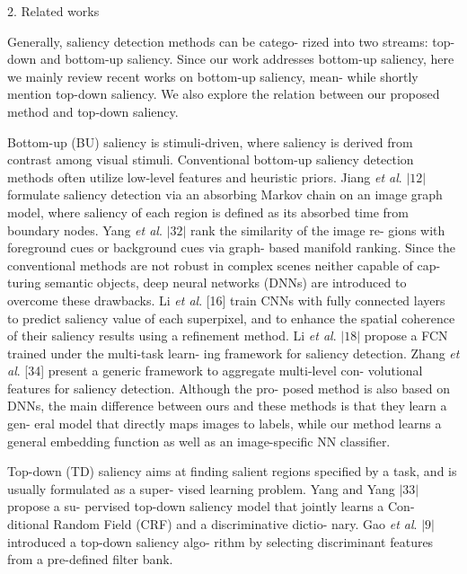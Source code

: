 \documentclass[a4paper,10pt]{article}
\begin{document}
2. Related works

Generally, saliency detection methods can be catego- rized into two streams: top-down and bottom-up saliency. Since our work addresses bottom-up saliency, here we mainly review recent works on bottom-up saliency, mean- while shortly mention top-down saliency. We also explore the relation between our proposed method and top-down saliency.

Bottom-up (BU) saliency is stimuli-driven, where saliency is derived from contrast among visual stimuli. Conventional bottom-up saliency detection methods often utilize low-level features and heuristic priors. Jiang {\it et al}. $|12|$ formulate saliency detection via an absorbing Markov chain on an image graph model, where saliency of each region is defined as its absorbed time from boundary nodes. Yang {\it et al}. $|32|$ rank the similarity of the image re- gions with foreground cues or background cues via graph- based manifold ranking. Since the conventional methods are not robust in complex scenes neither capable of cap- turing semantic objects, deep neural networks (DNNs) are introduced to overcome these drawbacks. Li {\it et al}. [16] train CNNs with fully connected layers to predict saliency value of each superpixel, and to enhance the spatial coherence of their saliency results using a refinement method. Li {\it et al}. $|18|$ propose a FCN trained under the multi-task learn- ing framework for saliency detection. Zhang {\it et al}. [34] present a generic framework to aggregate multi-level con- volutional features for saliency detection. Although the pro- posed method is also based on DNNs, the main difference between ours and these methods is that they learn a gen- eral model that directly maps images to labels, while our method learns a general embedding function as well as an image-specific NN classifier.

Top-down (TD) saliency aims at finding salient regions specified by a task, and is usually formulated as a super- vised learning problem. Yang and Yang $|33|$ propose a su- pervised top-down saliency model that jointly learns a Con- ditional Random Field (CRF) and a discriminative dictio- nary. Gao {\it et al}. $|9|$ introduced a top-down saliency algo- rithm by selecting discriminant features from a pre-defined filter bank.
\end{document}
